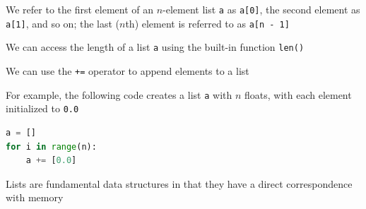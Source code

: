\documentclass[8pt,a4paper,compress]{beamer}
\begin{document}
\begin{frame}[fragile]
\pause

We refer to the first element of an $n$-element list \lstinline{a} as \lstinline{a[0]}, the second element as \lstinline{a[1]}, and so on; the last ($n$th) element is referred to as \lstinline{a[n - 1]}

\pause\bigskip

We can access the length of a list \lstinline{a} using the built-in function \lstinline{len()}

\pause\bigskip

We can use the \lstinline{+=} operator to append elements to a list

\pause\bigskip

For example, the following code creates a list \lstinline{a} with $n$ floats, with each element initialized to \lstinline{0.0}

\smallskip

\begin{lstlisting}[language=Python,style=focusin]
a = []
for i in range(n):
    a += [0.0]
\end{lstlisting} 

\pause\bigskip

Lists are fundamental data structures in that they have a direct correspondence with memory

\begin{center}
\end{center}
\end{frame}
\end{document}
